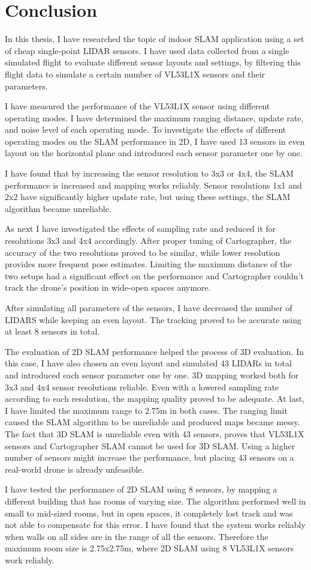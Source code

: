 \chapter{Conclusion}\label{chap:conclusion}
In this thesis, I have researched the topic of indoor SLAM application using a set of cheap single-point
LIDAR sensors. I have used data collected from a single simulated flight to evaluate different sensor
layouts and settings, by filtering this flight data to simulate a certain number of VL53L1X sensors and
their parameters.

I have measured the performance of the VL53L1X sensor using different operating modes. I have determined
the maximum ranging distance, update rate, and noise level of each operating mode. To investigate the
effects of different operating modes on the SLAM performance in 2D, I have used 13 sensors in even
layout on the horizontal plane and introduced each sensor parameter one by one.

I have found that by increasing the sensor resolution to 3x3 or 4x4, the SLAM performance is increased
and mapping works reliably. Sensor resolutions 1x1 and 2x2 have significantly higher update rate, but
using these settings, the SLAM algorithm became unreliable.

As next I have investigated the effects of sampling rate and reduced it for resolutions 3x3 and 4x4
accordingly. After proper tuning of Cartographer, the accuracy of the two resolutions proved to be similar,
while lower resolution provides more frequent pose estimates. Limiting the maximum distance of the two
setups had a significant effect on the performance and Cartographer couldn't track the drone's position
in wide-open spaces anymore.

After simulating all parameters of the sensors, I have decreased the number of LIDARS while keeping an
even layout. The tracking proved to be accurate using at least 8 sensors in total.

The evaluation of 2D SLAM performance helped the process of 3D evaluation. In this case, I have also
chosen an even layout and simulated 43 LIDARs in total and introduced each sensor parameter one by one.
3D mapping worked both for 3x3 and 4x4 sensor resolutions reliable. Even with a lowered sampling rate
according to each resolution, the mapping quality proved to be adequate.
At last, I have limited the maximum range to 2.75m in both cases. The ranging limit caused the SLAM
algorithm to be unreliable and produced maps became messy.
The fact that 3D SLAM is unreliable even with 43 sensors, proves that VL53L1X sensors and Cartographer
SLAM cannot be used for 3D SLAM. Using a higher number of sensors might increase the performance,
but placing 43 sensors on a real-world drone is already unfeasible.

I have tested the performance of 2D SLAM using 8 sensors, by mapping a different building
that has rooms of varying size. The algorithm performed well in small to mid-sized rooms, but in open
spaces, it completely lost track and was not able to compensate for this error. I have found that the system
works reliably when walls on all sides are in the range of all the sensors. Therefore the maximum room size
is 2.75x2.75m, where 2D SLAM using 8 VL53L1X sensors work reliably.
